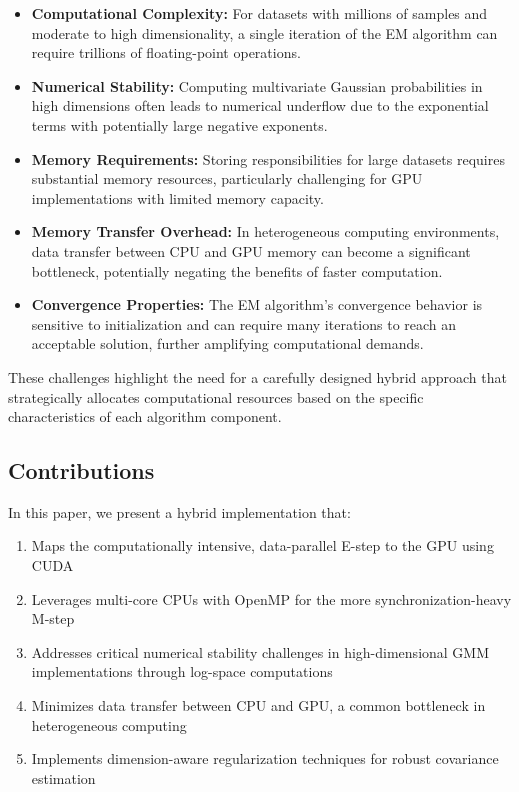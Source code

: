 \documentclass[conference]{IEEEtran}
\begin{document}
\begin{itemize}
    \item \textbf{Computational Complexity:} For datasets with millions of samples and moderate to high dimensionality, a single iteration of the EM algorithm can require trillions of floating-point operations.
    
    \item \textbf{Numerical Stability:} Computing multivariate Gaussian probabilities in high dimensions often leads to numerical underflow due to the exponential terms with potentially large negative exponents.
    
    \item \textbf{Memory Requirements:} Storing responsibilities for large datasets requires substantial memory resources, particularly challenging for GPU implementations with limited memory capacity.
    
    \item \textbf{Memory Transfer Overhead:} In heterogeneous computing environments, data transfer between CPU and GPU memory can become a significant bottleneck, potentially negating the benefits of faster computation.
    
    \item \textbf{Convergence Properties:} The EM algorithm's convergence behavior is sensitive to initialization and can require many iterations to reach an acceptable solution, further amplifying computational demands.
\end{itemize}

These challenges highlight the need for a carefully designed hybrid approach that strategically allocates computational resources based on the specific characteristics of each algorithm component.

\subsection{Contributions}

In this paper, we present a hybrid implementation that:
\begin{enumerate}
    \item Maps the computationally intensive, data-parallel E-step to the GPU using CUDA
    \item Leverages multi-core CPUs with OpenMP for the more synchronization-heavy M-step
    \item Addresses critical numerical stability challenges in high-dimensional GMM implementations through log-space computations
    \item Minimizes data transfer between CPU and GPU, a common bottleneck in heterogeneous computing
    \item Implements dimension-aware regularization techniques for robust covariance estimation

\end{enumerate}
\end{document}
